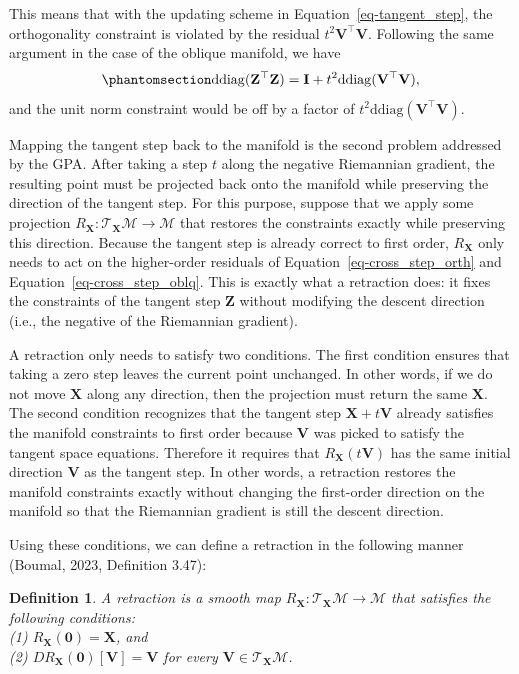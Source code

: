 \documentclass[
  12pt,
  letterpaper,
  article]{scrartcl}
\newtheorem{definition}{Definition}
\begin{document}
This means that with the updating scheme in
Equation~\ref{eq-tangent_step}, the orthogonality constraint is violated
by the residual \(t^2\mathbf{V}^\top\mathbf{V}\). Following the same
argument in the case of the oblique manifold, we have
\begin{equation}\protect\phantomsection\label{eq-cross_step_oblq}{
\mathrm{ddiag}(\mathbf{Z}^\top \mathbf{Z}) = \mathbf{I} + t^2\mathrm{ddiag}(\mathbf{V}^\top\mathbf{V}),
}\end{equation} and the unit norm constraint would be off by a factor of
\(t^2\text{ddiag}(\mathbf{V}^\top\mathbf{V})\).

Mapping the tangent step back to the manifold is the second problem
addressed by the GPA. After taking a step \(t\) along the negative
Riemannian gradient, the resulting point must be projected back onto the
manifold while preserving the direction of the tangent step. For this
purpose, suppose that we apply some projection
\(R_\mathbf{X}:\mathcal{T}_\mathbf{X}\mathcal{M}\rightarrow\mathcal{M}\)
that restores the constraints exactly while preserving this direction.
Because the tangent step is already correct to first order,
\(R_\mathbf{X}\) only needs to act on the higher-order residuals of
Equation~\ref{eq-cross_step_orth} and Equation~\ref{eq-cross_step_oblq}.
This is exactly what a retraction does: it fixes the constraints of the
tangent step \(\mathbf{Z}\) without modifying the descent direction
(i.e., the negative of the Riemannian gradient).

A retraction only needs to satisfy two conditions. The first condition
ensures that taking a zero step leaves the current point unchanged. In
other words, if we do not move \(\mathbf{X}\) along any direction, then
the projection must return the same \(\mathbf{X}\). The second condition
recognizes that the tangent step \(\mathbf{X} + t\mathbf{V}\) already
satisfies the manifold constraints to first order because \(\mathbf{V}\)
was picked to satisfy the tangent space equations. Therefore it requires
that \(R_{\mathbf{X}}(t\mathbf{V})\) has the same initial direction
\(\mathbf{V}\) as the tangent step. In other words, a retraction
restores the manifold constraints exactly without changing the
first-order direction on the manifold so that the Riemannian gradient is
still the descent direction.

Using these conditions, we can define a retraction in the following
manner (Boumal, 2023, Definition 3.47):

\begin{definition}
\label{retraction_definition}
A retraction is a smooth map
$R_\mathbf{X}:\mathcal{T}_\mathbf{X}\mathcal{M}\rightarrow\mathcal{M}$ that satisfies the following conditions: \\
(1) $R_\mathbf{X}(\mathbf{0})=\mathbf{X}$, and \\
(2) $DR_\mathbf{X}(\mathbf{0})[\mathbf{V}]=\mathbf{V}$ for every
$\mathbf{V}\in\mathcal{T}_\mathbf{X}\mathcal{M}$.
\end{definition}
\end{document}
